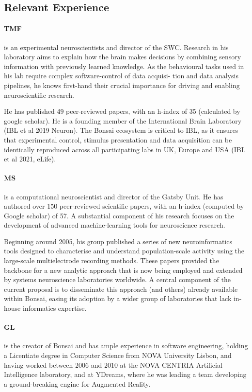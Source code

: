 
\subsection{Relevant Experience}

\paragraph{TMF} is an experimental neuroscientists and director of the SWC.
Research in his laboratory aims to explain how the brain makes decisions by
combining sensory information with previously learned knowledge. As the
behavioural tasks used in his lab require complex software-control of data
acquisi- tion and data analysis pipelines, he knows first-hand their crucial
importance for driving and enabling neuroscientific research.

He has published 49 peer-reviewed papers, with an h-index of 35 (calculated by
google scholar).  He is a founding member of the International Brain Laboratory
(IBL et al 2019 Neuron). The Bonsai ecosystem is critical to IBL, as it ensures
that experimental control, stimulus presentation and data acquisition can be
identically reproduced across all participating labs in UK, Europe and USA (IBL
et al 2021, eLife).

\paragraph{MS} is a computational neuroscientist and director of the Gatsby
Unit. He has authored over 150 peer-reviewed scientific papers, with an h-index
(computed by Google scholar) of 57. A substantial component of his research
focuses on the development of advanced machine-learning tools for
neuroscience research.

Beginning around 2005, his group published a series of new neuroinformatics
tools designed to characterise and understand population-scale activity using
the large-scale multielectrode recording methods. These papers
provided the backbone for a new analytic approach that is now being employed
and extended by systems neuroscience laboratories worldwide.
%
A central component of the current proposal is to disseminate this approach
(and others) already available within Bonsai, easing its adoption by a wider
group of laboratories that lack in-house informatics expertise.

\paragraph{GL} is the creator of Bonsai and has ample experience in software
engineering, holding a Licentiate degree in Computer Science from NOVA
University Lisbon, and having worked between 2006 and 2010 at the NOVA CENTRIA
Artificial Intelligence laboratory, and at YDreams, where he was leading a team
developing a ground-breaking engine for Augmented Reality.


